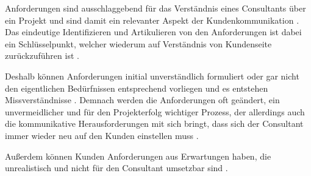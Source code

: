 \documentclass[../main.tex]{subfiles}
\begin{document}
Anforderungen sind ausschlaggebend für das Verständnis eines Consultants über ein Projekt und sind damit ein relevanter Aspekt der Kundenkommunikation \autocite{davis2006communication}.
Das eindeutige Identifizieren und Artikulieren von den Anforderungen ist dabei ein Schlüsselpunkt, welcher wiederum auf Verständnis von Kundenseite zurückzuführen ist \autocite{gamil2017identification, chakrabarti2004identification, salado2021systems}.

Deshalb können Anforderungen initial unverständlich formuliert oder gar nicht den eigentlichen Bedürfnissen entsprechend vorliegen und es entstehen Missverständnisse \autocite{bjarnason2017role}.
Demnach werden die Anforderungen oft geändert, ein unvermeidlicher und für den Projekterfolg wichtiger Prozess, der allerdings auch die kommunikative Herausforderungen mit sich bringt, dass sich der Consultant immer wieder neu auf den Kunden einstellen muss \autocite{oleff2022proaktives, davis2006communication, gamil2017identification}.

Außerdem können Kunden Anforderungen aus Erwartungen haben, die unrealistisch und nicht für den Consultant umsetzbar sind \autocite{bjarnason2017role}.
\end{document}
